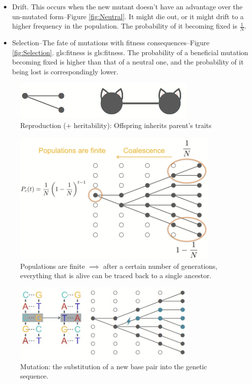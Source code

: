 \documentclass[]{article}
\begin{document}
\begin{itemize}
	\item Drift. This occurs when the new mutant doesn't have an advantage over the un-mutated form--Figure \ref{fig:Neutral}. It might die out, or it might drift to a higher frequency in the population. The probability of it becoming fixed is  $\frac{1}{N}$.
	
	\item Selection--The fate of mutations with fitness consequences--Figure \ref{fig:Selection}. \Gls{gls:fitness} is \glsdesc{gls:fitness}. The probability of a beneficial mutation becoming fixed is higher than that of a neutral one, and the probability of it being lost is correspondingly lower.

\end{itemize}

\begin{figure}[H]
	\caption[Reproduction (+ heritability)]{Reproduction (+ heritability): Offspring inherits parent’s traits}\label{fig:Reproduction1}
	\includegraphics[width=0.8\textwidth]{Reproduction1}
\end{figure}

\begin{figure}[H]
	\caption[Coalescence]{Populations are finite $\implies$ after a certain number of generations, everything that is alive can be traced back to a single ancestor.}\label{fig:Coalescence}
	\includegraphics[width=0.9\textwidth]{Coalescence}
\end{figure}

\begin{figure}[H]
	\caption[Mutation]{Mutation: the substitution of a new base pair into the genetic sequence.}\label{fig:Mutation1}
	\includegraphics[width=0.8\textwidth]{Mutation1}
\end{figure}
\end{document}
